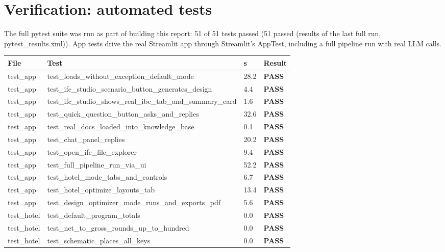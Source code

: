 \documentclass[10pt]{article}
\begin{document}
\section{Verification: automated tests}
The full pytest suite was run as part of building this report: 51 of 51 tests passed
(51 passed (results of the last full run, pytest\_results.xml)). App tests drive the real Streamlit app through Streamlit's AppTest, including a full pipeline
run with real LLM calls.
{\small \begin{longtable}{p{2.6cm}p{9.6cm}p{1.0cm}p{1.4cm}}
\toprule
\textbf{File} & \textbf{Test} & \textbf{s} & \textbf{Result} \\ \midrule \endhead
test\_app & test\_loads\_without\_exception\_default\_mode & 28.2 & \textcolor{pass}{\textbf{PASS}} \\
test\_app & test\_ifc\_studio\_scenario\_button\_generates\_design & 4.4 & \textcolor{pass}{\textbf{PASS}} \\
test\_app & test\_ifc\_studio\_shows\_real\_ibc\_tab\_and\_summary\_card & 1.6 & \textcolor{pass}{\textbf{PASS}} \\
test\_app & test\_quick\_question\_button\_asks\_and\_replies & 32.6 & \textcolor{pass}{\textbf{PASS}} \\
test\_app & test\_real\_docs\_loaded\_into\_knowledge\_base & 0.1 & \textcolor{pass}{\textbf{PASS}} \\
test\_app & test\_chat\_panel\_replies & 20.2 & \textcolor{pass}{\textbf{PASS}} \\
test\_app & test\_open\_ifc\_file\_explorer & 9.4 & \textcolor{pass}{\textbf{PASS}} \\
test\_app & test\_full\_pipeline\_run\_via\_ui & 52.2 & \textcolor{pass}{\textbf{PASS}} \\
test\_app & test\_hotel\_mode\_tabs\_and\_controls & 6.7 & \textcolor{pass}{\textbf{PASS}} \\
test\_app & test\_hotel\_optimize\_layouts\_tab & 13.4 & \textcolor{pass}{\textbf{PASS}} \\
test\_app & test\_design\_optimizer\_mode\_runs\_and\_exports\_pdf & 5.6 & \textcolor{pass}{\textbf{PASS}} \\
test\_hotel & test\_default\_program\_totals & 0.0 & \textcolor{pass}{\textbf{PASS}} \\
test\_hotel & test\_net\_to\_gross\_rounds\_up\_to\_hundred & 0.0 & \textcolor{pass}{\textbf{PASS}} \\
test\_hotel & test\_schematic\_places\_all\_keys & 0.0 & \textcolor{pass}{\textbf{PASS}} \\

\end{longtable}}
\end{document}
